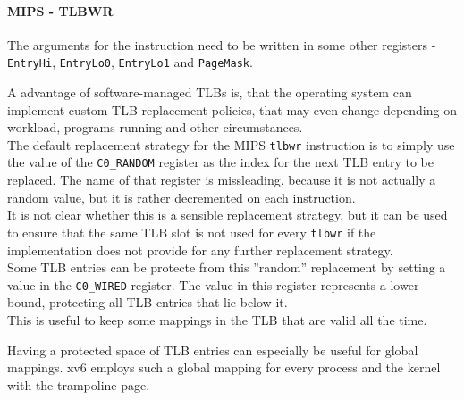 \paragraph{MIPS - TLBWR} The arguments for the instruction need to be written in some
other registers - \texttt{EntryHi}, \texttt{EntryLo0}, \texttt{EntryLo1} and \texttt{PageMask}.








A advantage of software-managed TLBs is, that the operating system can implement custom
TLB replacement policies, that may even change depending on workload, programs running
and other circumstances.\\
The default replacement strategy for the MIPS \texttt{tlbwr} instruction is to simply
use the value of the \texttt{C0\_RANDOM} register as the index for the next TLB entry
to be replaced. The name of that register is missleading, because it is not actually a
random value, but it is rather decremented on each instruction\cite{heiserAnatomyHighPerformanceMicrokernel}.\\
It is not clear whether this is a sensible replacement strategy,
but it can be used to ensure that the same TLB slot is not used for every \texttt{tlbwr} if the implementation
does not provide for any further replacement strategy.\\
Some TLB entries can be protecte from this ''random'' replacement by setting a value in the \texttt{C0\_WIRED}
register. The value in this register represents a lower bound, protecting all TLB entries that lie below it.\\
This is useful to keep some mappings in the TLB that are valid all the time.

Having a protected space of TLB entries can especially be useful for global mappings. xv6 employs such a global
mapping for every process and the kernel with the trampoline page.

